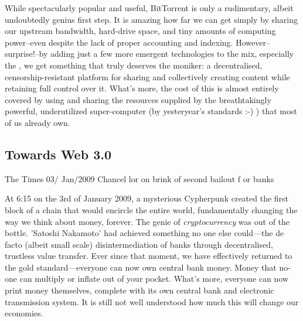 While spectacularly popular and useful, BitTorrent is only a rudimentary, albeit undoubtedly genius first step. It is amazing how far we can get simply by sharing our upstream bandwidth, hard-drive space, and tiny amounts of computing power–even despite the lack of proper accounting and indexing. However–surprise!–by adding just a few more emergent technologies to the mix, especially the , we get something that truly deserves the  moniker: a decentralised, censorship-resistant platform for sharing and collectively creating content while retaining full control over it. What's more, the cost of this is almost entirely covered by using and sharing the resources supplied by the breathtakingly powerful, underutilized super-computer (by yesteryear's standards :-) ) that most of us already own.

\subsection{Towards Web 3.0 \statusgreen}\label{sec:towards-web3}


\begin{centerverbatim}
The Times 03/
Jan/2009 Chancel
lor on brink of 
second bailout f
or banks
\end{centerverbatim}

At 6:15 on the 3rd of January 2009, a mysterious Cypherpunk created the first block of a chain that would encircle the entire world, fundamentally changing the way we think about money, forever. The genie of \emph{cryptocurrency} was out of the bottle. 'Satoshi Nakamoto' had achieved something no one else could—the de facto (albeit small scale) disintermediation of banks through decentralised, trustless value transfer. Ever since that moment, we have effectively returned to the gold standard—everyone can now own central bank money. Money that no-one can multiply or inflate out of your pocket. What's more, everyone can now print money themselves, complete with its own central bank and electronic transmission system. It is still not well understood how much this will change our economies.

